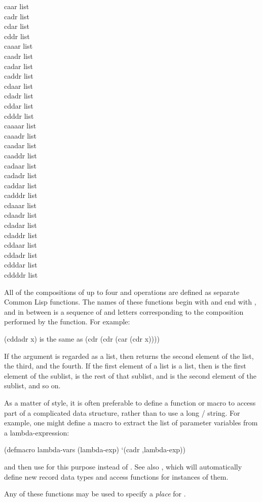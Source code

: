 \begin{defun}[Function]
caar list \\
cadr list \\
cdar list \\
cddr list \\
caaar list \\
caadr list \\
cadar list \\
caddr list \\
cdaar list \\
cdadr list \\
cddar list \\
cdddr list \\
caaaar list \\
caaadr list \\
caadar list \\
caaddr list \\
cadaar list \\
cadadr list \\
caddar list \\
cadddr list \\
cdaaar list \\
cdaadr list \\
cdadar list \\
cdaddr list \\
cddaar list \\
cddadr list \\
cdddar list \\
cddddr list

All of the compositions of up to four  and  operations
are defined as separate Common Lisp functions.
The names of these functions begin with  and end with ,
and in between is a sequence of  and  letters
corresponding to
the composition performed by the function. 
For example:
\begin{lisp}
(cddadr x) \textrm{is the same as} (cdr (cdr (car (cdr x))))
\end{lisp}
If the argument is regarded as a list, then  returns
the second element of the list,  the third, and 
the fourth.  If the first element of a list is a list, then
 is the first element of the sublist,  is the
rest of that sublist, and  is the second element of the sublist,
and so on.

As a matter of style, it is often preferable to define a function or
macro to access part of a complicated data structure, rather than to use
a long / string.  For example, one might define
a macro to extract the list of parameter variables from a lambda-expression:
\begin{lisp}
(defmacro lambda-vars (lambda-exp) `(cadr ,lambda-exp))
\end{lisp}
and then use  for this purpose instead of .
See also , which will automatically define
new record data types and access functions for instances of them.

Any of these functions may be used to specify a \emph{place} for .
\end{defun}
	
